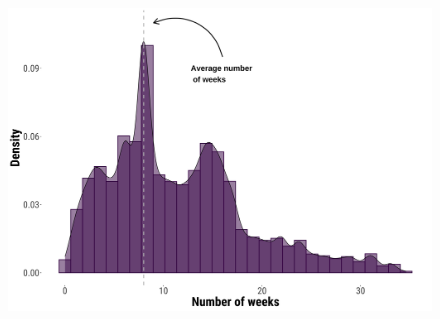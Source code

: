 \documentclass[
  11pt,
]{article}
\begin{document}
\begin{figure}

\begin{minipage}{\linewidth}
\begin{center}
\includegraphics[width=5.20833in,height=\textheight,keepaspectratio]{../outputs/sm/returns-duration.png}
\end{center}
\end{minipage}%

\end{figure}%
\end{document}
